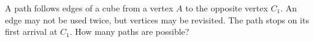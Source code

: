 A path follows edges of a cube from a vertex $A$ to the opposite vertex $C_1$. An edge may not be used twice, but vertices may be revisited. The path stops on its first arrival at $C_1$. How many paths are possible?
